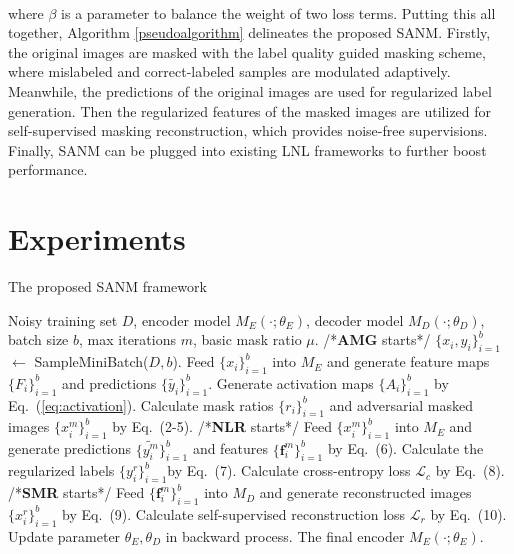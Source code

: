\documentclass[10pt,twocolumn,letterpaper]{article}
\begin{document}
\\
where $\beta$ is a parameter to balance the weight of two loss terms. Putting this all together, Algorithm \ref{pseudoalgorithm} delineates the proposed SANM. Firstly, the original images are masked with the label quality guided masking scheme, where mislabeled and correct-labeled samples are modulated adaptively. Meanwhile, the predictions of the original images are used for regularized label generation. Then the regularized features of the masked images are utilized for self-supervised masking reconstruction, which provides noise-free supervisions. Finally, SANM can be plugged into existing LNL frameworks to further boost performance.









\section{Experiments}
\vspace{-1em}

\begin{algorithm}[!t] 
    \footnotesize
    \caption{The proposed SANM framework}
    \label{alg:dmlp}
    \begin{algorithmic}[1]
    \renewcommand{\algorithmicrequire}{\textbf{Input:}}
    \REQUIRE Noisy training set $D$, encoder model $M_E(\cdot;\theta_{E})$, decoder model $M_D(\cdot;\theta_{D})$, batch size $b$, max iterations $m$, basic mask ratio $\mu$.
    \renewcommand{\algorithmicrequire}{ \textbf{Procedure:}}
    \REQUIRE
    \STATE /*\textbf{AMG} starts*/
    \STATE $\{x_i, y_i\}_{i=1} ^{b}$ $\leftarrow$ SampleMiniBatch($D, b$).
    \STATE Feed $\{x_i\}_{i=1} ^{b}$ into $M_E$ and generate feature maps $\{F_i\}_{i=1} ^{b}$ and predictions $\{\widetilde{y_i}\}_{i=1} ^{b}$.
    \STATE Generate activation maps $\{A_i\}_{i=1} ^{b}$ by Eq.~(\ref{eq:activation}).
    \STATE Calculate mask ratios $\{r_i\}_{i=1} ^{b}$ and adversarial masked images $\{x_i ^{m}\}_{i=1} ^{b}$ by Eq.~(2-5).
    \STATE /*\textbf{NLR} starts*/
    \STATE Feed $\{x_i ^{m}\}_{i=1} ^{b}$ into $M_E$ and generate predictions $\{{\widetilde{{y}_i ^m}}\}_{i=1} ^{b}$ and features $\{\mathbf{f}_i ^{m}\}_{i=1} ^{b}$ by Eq.~(6).
    \STATE Calculate the regularized labels $\{{{y}_{i} ^{r}}\}_{i=1} ^{b}$by Eq.~(7).
    \STATE Calculate cross-entropy loss $\mathcal{L}_c$ by Eq.~(8).
    \STATE /*\textbf{SMR} starts*/
    \STATE Feed $\{\mathbf{f}_i ^{m}\}_{i=1} ^{b}$ into $M_D$ and generate reconstructed images $\{x_i ^r\}_{i=1} ^{b}$ by Eq.~(9).
    \STATE Calculate self-supervised reconstruction loss $\mathcal{L}_r$ by Eq.~(10).
    \STATE Update parameter $\theta_E, \theta_D$ in backward process.
    \ENDFOR
    \renewcommand{\algorithmicensure}{\textbf{Output:}}
    \ENSURE The final encoder $M_E(\cdot;\theta_E)$.
    \end{algorithmic}  
    \label{pseudoalgorithm}
     
\end{algorithm}
\end{document}
